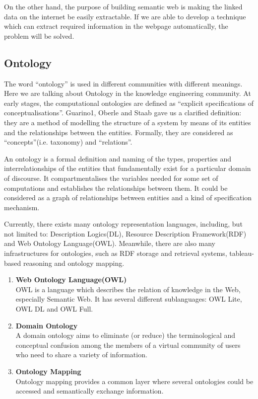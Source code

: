 On the other hand, the purpose of building semantic web is making the linked data on the internet be easily extractable. If we are able to develop a technique which can extract required information in the webpage automatically, the problem will be solved.

\subsection{Ontology}
The word ``ontology'' is used in different communities with different meanings. Here we are talking about Ontology in the knowledge engineering community. At early stages, the computational ontologies are defined as ``explicit specifications of conceptualisations''. Guarino1, Oberle and Staab gave us a clarified definition: they are a method of modelling the structure of a system by means of its entities and the relationships between the entities. Formally, they are considered as ``concepts''(i.e. taxonomy) and ``relations''\cite{guarino2009ontology}.

An ontology is a formal definition and naming of the types, properties and interrelationships of the entities that fundamentally exist for a particular domain of discourse. It compartmentalises the variables needed for some set of computations and establishes the relationships between them\cite{Gruber:1993:TAP:173743.173747}. It could be considered as a graph of relationships between entities and a kind of specification mechanism\cite{maedche2002ontology}.

Currently, there exists many ontology representation languages, including, but not limited to: Description Logics(DL), Resource Description Framework(RDF) and Web Ontology Language(OWL). Meanwhile, there are also many infrastructures for ontologies, such as RDF storage and retrieval systems, tableau-based reasoning and ontology mapping\cite{staab2013handbook}.

\begin{enumerate}
\item \textbf{Web Ontology Language(OWL)}\\
OWL is a language which describes the relation of knowledge in the Web, especially Semantic Web. It has several different sublanguages: OWL Lite, OWL DL and OWL Full\cite{maedche2002ontology}.

\item \textbf{Domain Ontology}\\
A domain ontology aims to eliminate (or reduce) the terminological and conceptual confusion among the members of a virtual community of users who need to share a variety of information\cite{Navigli:2004:LDO:1105710.1105712}.

\item \textbf{Ontology Mapping}\\
Ontology mapping provides a common layer where several ontologies could be accessed and semantically exchange information\cite{Kalfoglou:2003:OMS:975027.975028}.
\end{enumerate}

